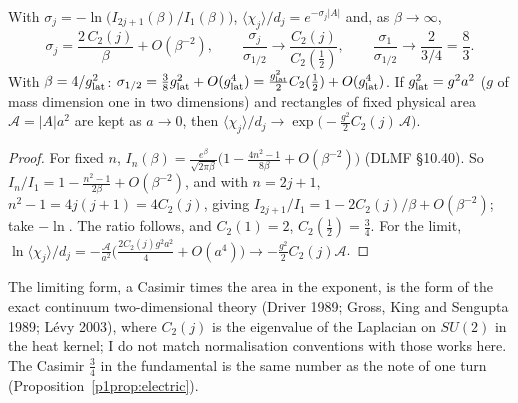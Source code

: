 \begin{corollary}\label{p2cor:casimir}
 With $\sigma_j=-\ln\bigl(I_{2j+1}(\beta)/I_1(\beta)\bigr)$, $\langle\chi_j\rangle/d_j=e^{-\sigma_j|A|}$
and, as $\beta\to\infty$,
\[
\sigma_j=\frac{2\,C_2(j)}{\beta}+O(\beta^{-2}),\qquad\frac{\sigma_j}{\sigma_{1/2}}\to\frac{C_2(j)}{C_2(\frac12)},\qquad
\frac{\sigma_1}{\sigma_{1/2}}\to\frac{2}{3/4}=\frac83 .
\]
With $\beta=4/g_{\rm lat}^2$: $\sigma_{1/2}=\tfrac38g_{\rm lat}^2+O(g_{\rm lat}^4)=\tfrac{g_{\rm lat}^2}{2}C_2(\tfrac12)+O(g_{\rm lat}^4)$.
If $g_{\rm lat}^2=g^2a^2$ ($g$ of mass dimension one in two dimensions) and rectangles of fixed physical area
$\mathcal{A}=|A|a^2$ are kept as $a\to0$, then $\langle\chi_j\rangle/d_j\to\exp\bigl(-\tfrac{g^2}{2}C_2(j)\,\mathcal{A}\bigr)$.
\end{corollary}
\begin{proof}
For fixed $n$, $I_n(\beta)=\frac{e^\beta}{\sqrt{2\pi\beta}}\bigl(1-\frac{4n^2-1}{8\beta}+O(\beta^{-2})\bigr)$ (DLMF
\S10.40). So $I_n/I_1=1-\frac{n^2-1}{2\beta}+O(\beta^{-2})$, and with $n=2j+1$, $n^2-1=4j(j+1)=4C_2(j)$, giving
$I_{2j+1}/I_1=1-2C_2(j)/\beta+O(\beta^{-2})$; take $-\ln$. The ratio follows, and $C_2(1)=2$, $C_2(\frac12)=\frac34$.
For the limit, $\ln\langle\chi_j\rangle/d_j=-\frac{\mathcal{A}}{a^2}\bigl(\frac{2C_2(j)g^2a^2}{4}+O(a^4)\bigr)\to-\frac{g^2}2C_2(j)\mathcal{A}$.
\end{proof}

\noindent The limiting form, a Casimir times the area in the exponent, is the form of the exact continuum
two-dimensional theory (Driver 1989; Gross, King and Sengupta 1989; L\'evy 2003), where $C_2(j)$ is the eigenvalue of the
Laplacian on $SU(2)$ in the heat kernel; I do not match normalisation conventions with those works here. The Casimir
$\frac34$ in the fundamental is the same number as the note of one turn (Proposition~\ref{p1prop:electric}).

